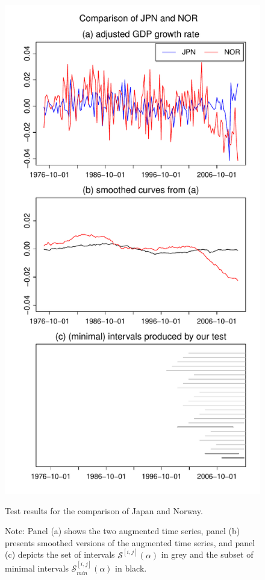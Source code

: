 \documentclass[a4paper,12pt]{article}
\begin{document}
\begin{figure}[p!]
\begin{center}
\begin{minipage}[t]{0.49\textwidth}
\includegraphics[width=\textwidth]{Plots/gdp/JPN_vs_NOR}
\caption{Test results for the comparison of Japan and Norway.}\label{fig:Japan:Norway}
\end{minipage}
\end{center}
\caption*{Note: Panel (a) shows the two augmented time series, panel (b) presents smoothed versions of the augmented time series, and panel (c) depicts the set of intervals $\mathcal{S}^{[i, j]}(\alpha)$ in grey and the subset of minimal intervals $\mathcal{S}^{[i, j]}_{min}(\alpha)$ in black.}
\end{figure}
\end{document}
